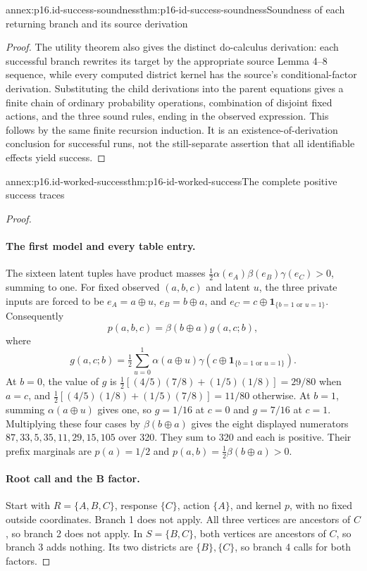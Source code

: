 \begin{annexitem}{annex:p16.id-success-soundness}{thm:p16-id-success-soundness}{Soundness of each returning branch and its source derivation}
\begin{proof}
The utility theorem also gives the distinct do-calculus derivation:
each successful branch rewrites its target by the appropriate
source Lemma 4--8 sequence, while every computed district kernel
has the source's conditional-factor derivation. Substituting the
child derivations into the parent equations gives a finite chain
of ordinary probability operations, combination of disjoint fixed
actions, and the three sound rules, ending in the observed expression.
This follows by the same finite recursion induction. It is an
existence-of-derivation conclusion for successful runs, not the
still-separate assertion that all identifiable effects yield success.
\end{proof}
\end{annexitem}

\begin{annexitem}{annex:p16.id-worked-success}{thm:p16-id-worked-success}{The complete positive success traces}
\begin{proof}
\paragraph{The first model and every table entry.}
The sixteen latent tuples have product masses
\(\frac12\alpha(e_A)\beta(e_B)\gamma(e_C)>0\), summing to one.
For fixed observed \((a,b,c)\) and latent \(u\), the three
private inputs are forced to be
\(e_A=a\oplus u\), \(e_B=b\oplus a\), and
\(e_C=c\oplus\mathbf1_{\{b=1\text{ or }u=1\}}\).
Consequently
\[
 p(a,b,c)=\beta(b\oplus a)g(a,c;b),
\]
where
\[
 g(a,c;b)=\tfrac12\sum_{u=0}^1\alpha(a\oplus u)
                 \gamma(c\oplus\mathbf1_{\{b=1\text{ or }u=1\}}).
\]
At \(b=0\), the value of \(g\) is
\(\frac12[(4/5)(7/8)+(1/5)(1/8)]=29/80\) when \(a=c\),
and \(\frac12[(4/5)(1/8)+(1/5)(7/8)]=11/80\) otherwise.
At \(b=1\), summing \(\alpha(a\oplus u)\) gives one,
so \(g=1/16\) at \(c=0\) and \(g=7/16\) at \(c=1\).
Multiplying these four cases by \(\beta(b\oplus a)\) gives
the eight displayed numerators
\(87,33,5,35,11,29,15,105\) over 320. They sum to 320
and each is positive. Their prefix marginals are
\(p(a)=1/2\) and \(p(a,b)=\frac12\beta(b\oplus a)>0\).

\paragraph{Root call and the B factor.}
Start with \(R=\{A,B,C\}\), response \(\{C\}\), action
\(\{A\}\), and kernel \(p\), with no fixed outside coordinates.
Branch 1 does not apply. All three vertices are ancestors of \(C\),
so branch 2 does not apply. In \(S=\{B,C\}\), both vertices
are ancestors of \(C\), so branch 3 adds nothing. Its two
districts are \(\{B\},\{C\}\), so branch 4 calls for both factors.


\end{proof}
\end{annexitem}
